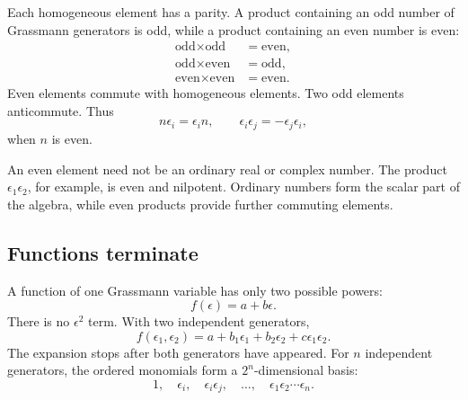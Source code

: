 Each homogeneous element has a parity. A product containing an odd number of Grassmann generators is odd, while a product containing an even number is even:
\begin{align}
\text{odd}\times\text{odd}&=\text{even},\\
\text{odd}\times\text{even}&=\text{odd},\\
\text{even}\times\text{even}&=\text{even}.
\end{align}
Even elements commute with homogeneous elements. Two odd elements anticommute. Thus
\begin{equation}
n\epsilon_i=\epsilon_i n,
\qquad
\epsilon_i\epsilon_j=-\epsilon_j\epsilon_i,
\end{equation}
when \(n\) is even.

An even element need not be an ordinary real or complex number. The product
\(\epsilon_1\epsilon_2\), for example, is even and nilpotent. Ordinary numbers form the scalar part of the algebra, while even products provide further commuting elements.

\begin{classroomqa}
\end{classroomqa}

\subsection{Functions terminate}

A function of one Grassmann variable has only two possible powers:
\begin{equation}
f(\epsilon)=a+b\epsilon.
\end{equation}
There is no \(\epsilon^2\) term. With two independent generators,
\begin{equation}
f(\epsilon_1,\epsilon_2)
=a+b_1\epsilon_1+b_2\epsilon_2+c\epsilon_1\epsilon_2.
\end{equation}
The expansion stops after both generators have appeared. For \(n\) independent generators, the ordered monomials form a \(2^n\)-dimensional basis:
\begin{equation}
1,\quad
\epsilon_i,\quad
\epsilon_i\epsilon_j,\quad
\ldots,\quad
\epsilon_1\epsilon_2\cdots\epsilon_n.
\end{equation}

